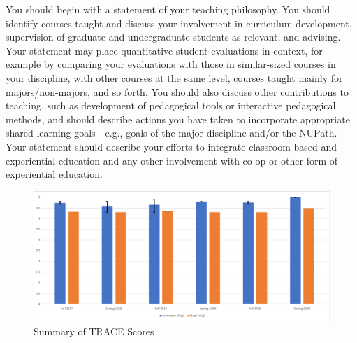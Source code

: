 You should begin with a statement of your teaching philosophy. 
You should identify courses taught and discuss your involvement in curriculum development, supervision of graduate and undergraduate students as relevant, and advising. 
Your statement may place quantitative student evaluations in context, for example by comparing your evaluations with those in similar-sized courses in your discipline, with other courses at the same level, courses taught mainly for majors/non-majors, and so forth. 
You should also discuss other contributions to teaching, such as development of pedagogical tools or interactive pedagogical methods, and should describe actions you have taken to incorporate appropriate shared learning goals—e.g., goals of the major discipline and/or the NUPath. 
Your statement should describe your efforts to integrate classroom-based and experiential education and any other involvement with co-op or other form of experiential education.

\newpage

\begin{landscape}
    \hspace{8.0cm}

    \begin{center}
        \begin{figure}[h!]
            \centerline{\includegraphics[width=0.9\linewidth]{section-e/files/TRACEChart.pdf}}
            \caption{Summary of TRACE Scores}
            \label{trace-summary}
        \end{figure}
    \end{center}
\end{landscape}